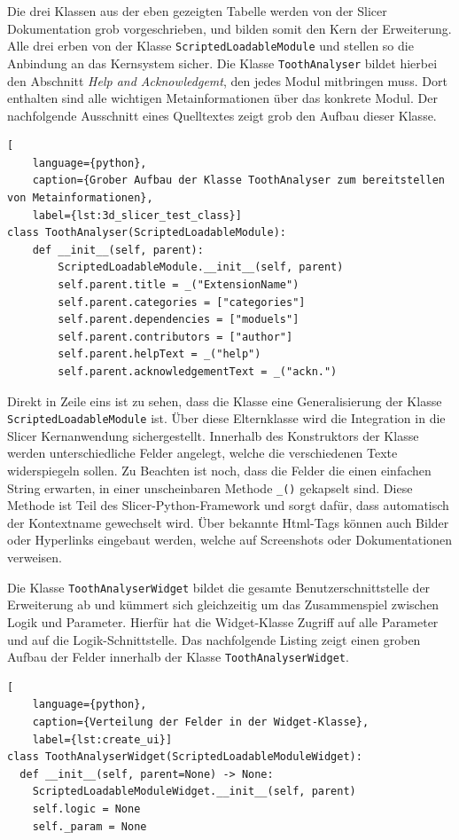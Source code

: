 Die drei Klassen aus der eben gezeigten Tabelle werden von der Slicer Dokumentation
grob vorgeschrieben, und bilden somit den Kern der Erweiterung. Alle drei erben von
der Klasse \texttt{ScriptedLoadableModule} und stellen so die Anbindung an das
Kernsystem sicher. Die Klasse \texttt{ToothAnalyser} bildet hierbei den
Abschnitt \textit{Help and Acknowledgemt}, den jedes Modul mitbringen muss. Dort
enthalten sind alle wichtigen Metainformationen über das konkrete Modul. Der
nachfolgende Ausschnitt eines Quelltextes zeigt grob den Aufbau dieser Klasse.

\begin{lstlisting}[
    language={python},
    caption={Grober Aufbau der Klasse ToothAnalyser zum bereitstellen von Metainformationen},
    label={lst:3d_slicer_test_class}]
class ToothAnalyser(ScriptedLoadableModule):
    def __init__(self, parent):
	    ScriptedLoadableModule.__init__(self, parent)
	    self.parent.title = _("ExtensionName")
	    self.parent.categories = ["categories"]
	    self.parent.dependencies = ["moduels"]
	    self.parent.contributors = ["author"]
	    self.parent.helpText = _("help")
	    self.parent.acknowledgementText = _("ackn.")
\end{lstlisting}

Direkt in Zeile eins ist zu sehen, dass die Klasse eine Generalisierung der
Klasse \texttt{ScriptedLoadableModule} ist. Über diese Elternklasse wird die
Integration in die Slicer Kernanwendung sichergestellt. Innerhalb des Konstruktors
der Klasse werden unterschiedliche Felder angelegt, welche die verschiedenen
Texte widerspiegeln sollen. Zu Beachten ist noch, dass die Felder die einen
einfachen String erwarten, in einer unscheinbaren Methode \texttt{\_()}
gekapselt sind. Diese Methode ist Teil des Slicer-Python-Framework und sorgt dafür,
dass automatisch der Kontextname gewechselt wird. Über bekannte Html-Tags können
auch Bilder oder Hyperlinks eingebaut werden, welche auf Screenshots oder
Dokumentationen verweisen.

Die Klasse \texttt{ToothAnalyserWidget} bildet die gesamte Benutzerschnittstelle
der Erweiterung ab und kümmert sich gleichzeitig um das Zusammenspiel zwischen Logik
und Parameter. Hierfür hat die Widget-Klasse Zugriff auf alle Parameter und auf
die Logik-Schnittstelle. Das nachfolgende Listing zeigt einen groben Aufbau der Felder
innerhalb der Klasse \texttt{ToothAnalyserWidget}.

\begin{lstlisting}[
    language={python},
    caption={Verteilung der Felder in der Widget-Klasse},
    label={lst:create_ui}]
class ToothAnalyserWidget(ScriptedLoadableModuleWidget):
  def __init__(self, parent=None) -> None:
    ScriptedLoadableModuleWidget.__init__(self, parent)
    self.logic = None
    self._param = None
\end{lstlisting}

